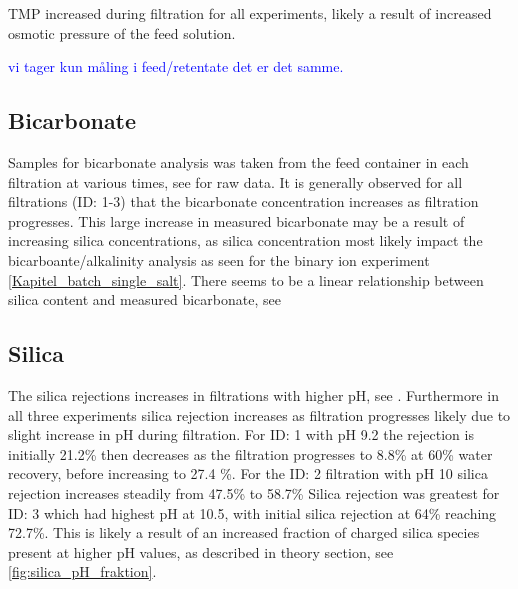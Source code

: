 TMP increased during filtration for all experiments, likely a result of increased osmotic pressure of the feed solution.

\textcolor{blue}{vi tager kun måling i feed/retentate det er det samme.}

\subsection{Bicarbonate}

Samples for bicarbonate analysis was taken from the feed container in each filtration at various times, see  for raw data.
It is generally observed for all filtrations (ID: 1-3) that the bicarbonate concentration increases as filtration progresses.
This large increase in measured bicarbonate may be a result of increasing silica concentrations, as silica concentration most likely impact the bicarboante/alkalinity analysis as seen for the binary ion experiment \cref{Kapitel_batch_single_salt}.
There seems to be a linear relationship between silica content and measured bicarbonate, see 


\subsection{Silica}

The silica rejections increases in filtrations with higher pH, see .
Furthermore in all three experiments silica rejection increases as filtration progresses likely due to slight increase in pH during filtration.
For ID: 1 with pH 9.2 the rejection is initially 21.2\% then decreases as the filtration progresses to 8.8\% at 60\% water recovery, before increasing to 27.4 \%. 
For the ID: 2 filtration with pH 10 silica rejection increases steadily from 47.5\% to 58.7\%
Silica rejection was greatest for ID: 3 which had highest pH at 10.5, with initial silica rejection at 64\% reaching 72.7\%. 
This is likely a result of an increased fraction of charged silica species present at higher pH values, as described in theory section, see \cref{fig:silica_pH_fraktion}. 

